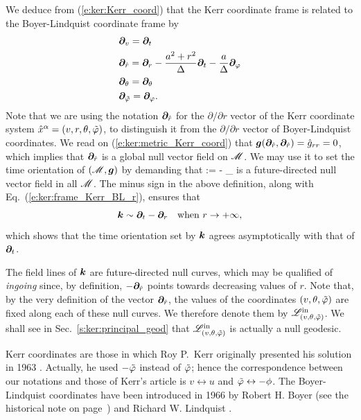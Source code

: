 We deduce from (\ref{e:ker:Kerr_coord}) that the Kerr coordinate frame
is related to the Boyer-Lindquist coordinate frame by
\begin{subequations}
\label{e:ker:frame_Kerr_BL}
\begin{align}
    & \bm{\partial}_v = \bm{\partial}_t \\
    & \bm{\partial}_{\hat{r}} = \bm{\partial}_r - \frac{a^2+r^2}{\Delta} \bm{\partial}_t
                        - \frac{a}{\Delta} \bm{\partial}_\varphi \label{e:ker:frame_Kerr_BL_r}\\
    & \bm{\partial}_\theta = \bm{\partial}_\theta \\
    & \bm{\partial}_{{\tilde\varphi}} = \bm{\partial}_\varphi .
\end{align}
\end{subequations}
Note that we are using the notation $\bm{\partial}_{\hat{r}}$ for the $\partial/\partial r$
vector of the Kerr coordinate system $\hat{x}^\alpha = (v,r,\theta,{\tilde\varphi})$, to distinguish
it from the $\partial/\partial r$ vector of Boyer-Lindquist coordinates.
We read on (\ref{e:ker:metric_Kerr_coord}) that
$\bm{g}(\bm{\partial}_{\hat{r}},\bm{\partial}_{\hat{r}}) = \hat{g}_{rr} = 0$, which
implies that $\bm{\partial}_{\hat{r}}$ is a global null vector field on $\mathscr{M}$.
We may use it to set the time orientation of $(\mathscr{M},\bm{g})$ by demanding that
\be \label{e:ker:def_k_hat_r}
     := - \wpar_{}
\ee
is a future-directed null vector field in all $\mathscr{M}$. The minus sign
in the above definition, along with Eq.~(\ref{e:ker:frame_Kerr_BL_r}),
ensures that
\[
    \bm{k} \sim \bm{\partial}_t -  \bm{\partial}_r  \quad\mbox{when}\
            r \rightarrow +\infty ,
\]
which shows that the time orientation set by $\bm{k}$ agrees asymptotically
with that of $\bm{\partial}_t$.


The field lines
of $\bm{k}$ are future-directed null curves,
which may be qualified of \emph{ingoing} since, by definition, $-\bm{\partial}_{\hat{r}}$ points towards
decreasing values of $r$. Note that, by the very definition of
the vector $\bm{\partial}_{\hat{r}}$,
the values of the coordinates $(v,\theta,{\tilde\varphi})$ are fixed along each of these
null curves. We therefore denote them by $\mathscr{L}^{\rm in}_{(v,\theta,{\tilde\varphi})}$.
We shall see in Sec.~\ref{s:ker:principal_geod} that $\mathscr{L}^{\rm in}_{(v,\theta,{\tilde\varphi})}$ is actually a null geodesic.


\begin{hist} \label{h:ker:Kerr_coord}
Kerr coordinates are those in which Roy P.~Kerr originally presented his
solution in 1963 \cite{Kerr63}. Actually, he used $-{\tilde\varphi}$ instead of ${\tilde\varphi}$; hence
the correspondence between our notations and those of Kerr's article \cite{Kerr63}
is $v\leftrightarrow u$ and ${\tilde\varphi}\leftrightarrow -\phi$.
The Boyer-Lindquist coordinates have been introduced in 1966 by Robert H. Boyer (see the historical note on page~\pageref{h:sta:Boyer}) and Richard W. Lindquist \cite{BoyerL67}.
\end{hist}

